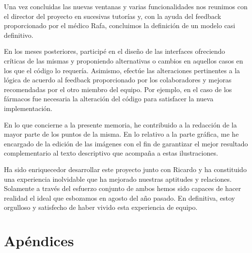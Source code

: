 \documentclass[11pt,spanish,
		listoftables,listoffigures]
		{tfgplantilla}
\begin{document}
Una vez concluidas las nuevas ventanas y varias funcionalidades nos reunimos con el director del proyecto en sucesivas tutorías y, con la ayuda del feedback proporcionado por el médico Rafa, concluimos la definición de un modelo casi definitivo. 

En los meses posteriores, participé en el diseño de las interfaces ofreciendo críticas de las mismas y proponiendo alternativas o cambios en aquellos casos en los que el código lo requería. Asimismo, efectúe las alteraciones pertinentes a la lógica de acuerdo al feedback proporcionado por los colaboradores y mejoras recomendadas por el otro miembro del equipo. Por ejemplo, en el caso de los fármacos fue necesaria la alteración del código para satisfacer la nueva implementación.

En lo que concierne a la presente memoria, he contribuido a la redacción de la mayor parte de los puntos de la misma. En lo relativo a la parte gráfica, me he encargado de la edición de las imágenes con el fin de garantizar el mejor resultado complementario al texto descriptivo que acompaña a estas ilustraciones.

Ha sido enriquecedor desarrollar este proyecto junto con Ricardo y ha constituido una experiencia inolvidable que ha mejorado nuestras aptitudes y relaciones. Solamente a través del esfuerzo conjunto de ambos hemos sido capaces de hacer realidad el ideal que esbozamos en agosto del año pasado. En definitiva, estoy orgulloso y satisfecho de haber vivido esta experiencia de equipo.

\cleardoublepage


\chapter{Apéndices}


\end{document}
